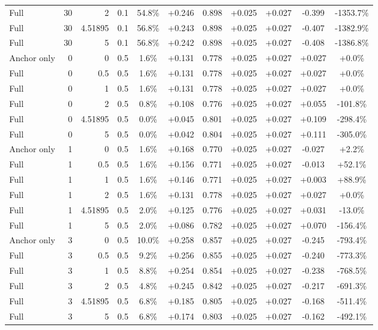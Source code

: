 \begin{table}[htbp]
\begin{tabular}{lrrrccccccc}
Full & 30 & 2 & 0.1 & 54.8\% & +0.246 & 0.898 & +0.025 & +0.027 & -0.399 & -1353.7\% \\
Full & 30 & 4.51895 & 0.1 & 56.8\% & +0.243 & 0.898 & +0.025 & +0.027 & -0.407 & -1382.9\% \\
Full & 30 & 5 & 0.1 & 56.8\% & +0.242 & 0.898 & +0.025 & +0.027 & -0.408 & -1386.8\% \\
Anchor only & 0 & 0 & 0.5 & 1.6\% & +0.131 & 0.778 & +0.025 & +0.027 & +0.027 & +0.0\% \\
Full & 0 & 0.5 & 0.5 & 1.6\% & +0.131 & 0.778 & +0.025 & +0.027 & +0.027 & +0.0\% \\
Full & 0 & 1 & 0.5 & 1.6\% & +0.131 & 0.778 & +0.025 & +0.027 & +0.027 & +0.0\% \\
Full & 0 & 2 & 0.5 & 0.8\% & +0.108 & 0.776 & +0.025 & +0.027 & +0.055 & -101.8\% \\
Full & 0 & 4.51895 & 0.5 & 0.0\% & +0.045 & 0.801 & +0.025 & +0.027 & +0.109 & -298.4\% \\
Full & 0 & 5 & 0.5 & 0.0\% & +0.042 & 0.804 & +0.025 & +0.027 & +0.111 & -305.0\% \\
Anchor only & 1 & 0 & 0.5 & 1.6\% & +0.168 & 0.770 & +0.025 & +0.027 & -0.027 & +2.2\% \\
Full & 1 & 0.5 & 0.5 & 1.6\% & +0.156 & 0.771 & +0.025 & +0.027 & -0.013 & +52.1\% \\
Full & 1 & 1 & 0.5 & 1.6\% & +0.146 & 0.771 & +0.025 & +0.027 & +0.003 & +88.9\% \\
Full & 1 & 2 & 0.5 & 1.6\% & +0.131 & 0.778 & +0.025 & +0.027 & +0.027 & +0.0\% \\
Full & 1 & 4.51895 & 0.5 & 2.0\% & +0.125 & 0.776 & +0.025 & +0.027 & +0.031 & -13.0\% \\
Full & 1 & 5 & 0.5 & 2.0\% & +0.086 & 0.782 & +0.025 & +0.027 & +0.070 & -156.4\% \\
Anchor only & 3 & 0 & 0.5 & 10.0\% & +0.258 & 0.857 & +0.025 & +0.027 & -0.245 & -793.4\% \\
Full & 3 & 0.5 & 0.5 & 9.2\% & +0.256 & 0.855 & +0.025 & +0.027 & -0.240 & -773.3\% \\
Full & 3 & 1 & 0.5 & 8.8\% & +0.254 & 0.854 & +0.025 & +0.027 & -0.238 & -768.5\% \\
Full & 3 & 2 & 0.5 & 4.8\% & +0.245 & 0.842 & +0.025 & +0.027 & -0.217 & -691.3\% \\
Full & 3 & 4.51895 & 0.5 & 6.8\% & +0.185 & 0.805 & +0.025 & +0.027 & -0.168 & -511.4\% \\
Full & 3 & 5 & 0.5 & 6.8\% & +0.174 & 0.803 & +0.025 & +0.027 & -0.162 & -492.1\% \\

\end{tabular}
\end{table}
